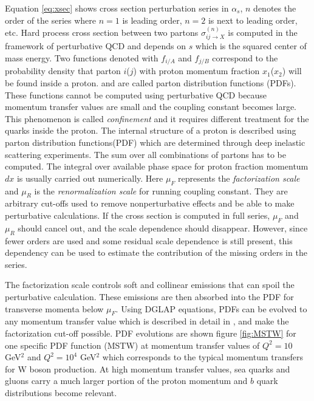 \par Equation \ref{eq:xsec} shows cross section perturbation series in $\alpha_s$, $n$ denotes the order of the series where $n=1$ is leading order, $n=2$ is next to leading order, etc. 
Hard process cross section between two partons $\sigma_{ij \rightarrow X}^{(n)}$ is computed in the framework of perturbative QCD and depends on $s$ which is the squared center of mass energy. 
Two functions denoted with $f_{i/A}$ and $f_{j/B}$ correspond to the probability density that parton $i$($j$) with proton momentum fraction $x_1$($x_2$) will be found inside a proton. and are called parton distribution functions (PDFs). These functions cannot be computed using perturbative QCD because momentum transfer values are small and the coupling constant becomes large. This phenomenon is called \textit{confinement} and it requires different treatment for the quarks inside the proton. The internal structure of a proton is described using parton distribution functions(PDF) which  are determined through deep inelastic scattering experiments. The sum over all combinations of partons has to be computed. The integral over available phase space for proton fraction momentum $dx$ is usually carried out numerically. 
Here $\mu_F$ represents the \textit{factorization scale} and $\mu_R$ is the \textit{renormalization scale} for running coupling constant. They are arbitrary cut-offs used to remove nonperturbative effects and be able to make perturbative calculations. If the cross section is computed in full series, $\mu_F$ and $\mu_R$ should cancel out, and the scale dependence should disappear. However, since fewer orders are used and some residual scale dependence is still present, this dependency can be used to estimate the contribution of the missing orders in the series.  
\par  The factorization scale controls soft and collinear emissions that can spoil the perturbative calculation. These emissions are then absorbed into the PDF for transverse momenta below $\mu_F$. Using DGLAP equations, PDFs can be evolved to any momentum transfer value which is described in detail in \cite{Campbell:2006wx}, and make the factorization cut-off possible. PDF evolutions are shown figure \ref{fig:MSTW} for one specific PDF function (MSTW) at momentum transfer values of $Q^2=10$ GeV$^2$ and $Q^2=10^4$ GeV$^2$ which corresponds to the typical momentum transfers for W boson production. At high momentum transfer values, sea quarks and gluons carry a much larger portion of the proton momentum and $b$ quark distributions become relevant.
